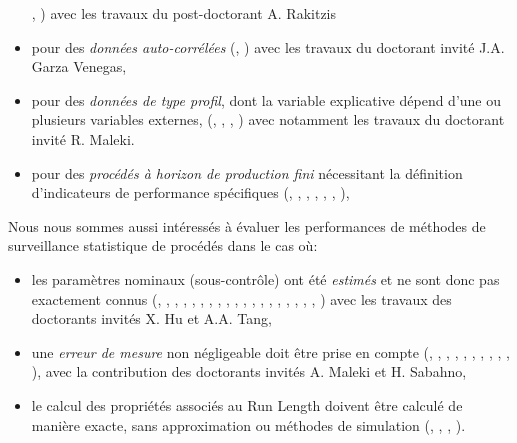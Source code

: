 \begin{itemize}
  \cite{rakitzis:hal-01345887}, \cite{rakitzis:hal-01166916}) avec les
  travaux du post-doctorant A. Rakitzis
\item pour des \emph{données auto-corrélées}
  (\cite{garzavenegas:hal-01824643}, \cite{franco:hal-01169579}) avec
  les travaux du doctorant invité J.A. Garza Venegas,
\item pour des \emph{données de type profil}, dont la variable
  explicative dépend d'une ou plusieurs variables externes,
  (\cite{maleki:hal-02183432}, \cite{maleki:hal-01870773},
  \cite{maleki:hal-01905445}, \cite{guevara:hal-01580777}) avec
  notamment les travaux du doctorant invité R. Maleki.
\item pour des \emph{procédés à horizon de production fini}
  nécessitant la définition d'indicateurs de performance spécifiques
  (\cite{chong:hal-01978750}, \cite{celano:hal-01921379},
  \cite{celano:hal-01921386}, \cite{nenes:hal-01425549},
  \cite{celano:hal-01313577}, \cite{celano:hal-01367280},
  \cite{celano:hal-01382239}),
\end{itemize}

Nous nous sommes aussi intéressés à évaluer les performances de
méthodes de surveillance statistique de procédés dans le cas où:
\begin{itemize}
\item les paramètres nominaux (sous-contrôle) ont été \emph{estimés}
  et ne sont donc pas exactement connus (\cite{chong:hal-01978769},
  \cite{tang:hal-02015138}, \cite{tang:hal-02145998},
  \cite{hu:hal-02155302}, \cite{hu:hal-02160997},
  \cite{castagliola:hal-02190734}, \cite{hu:hal-02318364},
  \cite{khoo:hal-02354567}, \cite{hu:hal-01835841},
  \cite{oprime:hal-01421764}, \cite{you:hal-01614074},
  \cite{teoh:hal-01583912}, \cite{hu:hal-01668745},
  \cite{wu:hal-01286478}, \cite{teoh:hal-01326056},
  \cite{castagliola:hal-01349529}, \cite{yeong:hal-01180304},
  \cite{teoh:hal-01185340}, \cite{you:hal-01216234},
  \cite{you:hal-01348052}) avec les travaux des doctorants invités
  X. Hu et A.A. Tang,
\item une \emph{erreur de mesure} non négligeable doit être prise en
  compte (\cite{sabahno:hal-01977765}, \cite{tang:hal-01978754},
  \cite{sabahno:hal-02190729}, \cite{tang:hal-01806538},
  \cite{sabahno:hal-01921390}, \cite{maleki:hal-01423386},
  \cite{tran:hal-01668732}, \cite{hu:hal-01307056},
  \cite{hu:hal-01327313}, \cite{hu:hal-01396018},
  \cite{hu:hal-01228430}), avec la contribution des doctorants invités
  A. Maleki et H. Sabahno,
\item le calcul des propriétés associés au Run Length doivent être
  calculé de manière exacte, sans approximation ou méthodes de
  simulation (\cite{castagliola:hal-02002980},
  \cite{maravelakis:hal-02022526}, \cite{tang:hal-02059892},
  \cite{khoo:hal-01354062}). 
\end{itemize}

